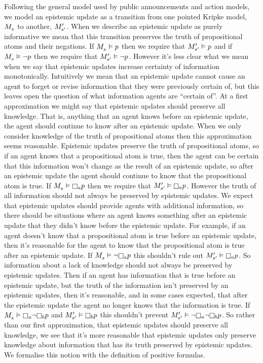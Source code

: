 Following the general model used by public announcements and action models, we model an epistemic update as a transition from one pointed Kripke model, $\kPModel{\kStateS}$ to another, ${M^{\prime}_{{s}^{\prime}}}$.
When we describe an epistemic update as purely informative we mean that this transition preserves the truth of propositional atoms and their negations.
If $\kPModel{\kStateS} \entails \atomP$ then we require that ${M^{\prime}_{{s}^{\prime}}} \vDash p$ and if $\kPModel{\kStateS} \entails \lnot \atomP$ then we require that ${M^{\prime}_{{s}^{\prime}}} \vDash \lnot p$.
However it's less clear what we mean when we say that epistemic updates increase certainty of information monotonically.
Intuitively we mean that an epistemic update cannot cause an agent to forget or revise information that they were previously certain of, but this leaves open the question of what information agents are ``certain of''.
At a first approximation we might say that epistemic updates should preserve all knowledge.
That is, anything that an agent knows before an epistemic update, the agent should continue to know after an epistemic update.
When we only consider knowledge of the truth of propositional atoms then this approximation seems reasonable.
Epistemic updates preserve the truth of propositional atoms, so if an agent knows that a propositional atom is true, then the agent can be certain that this information won't change as the result of an epistemic update, so after an epistemic update the agent should continue to know that the propositional atom is true.
If $\kPModel{\kStateS} \entails \knowsA \atomP$ then we require that $\kPModelP{\kStateSP} \entails \knowsA \atomP$.
However the truth of all information should not always be preserved by epistemic updates.
We expect that epistemic updates should provide agents with additional information, so there should be situations where an agent knows something after an epistemic update that they didn't know before the epistemic update.
For example, if an agent doesn't know that a propositional atom is true before an epistemic update, then it's reasonable for the agent to know that the propositional atom is true after an epistemic update.
If $\kPModel{\kStateS} \entails \lnot \knowsA \atomP$ this shouldn't rule out $\kPModelP{\kStateSP} \entails \knowsA \atomP$.
So information about a lack of knowledge should not always be preserved by epistemic updates.
Then if an agent has information that is true before an epistemic update, but the truth of the information isn't preserved by an epistemic updates, then it's reasonable, and in some cases expected, that after the epistemic update the agent no longer knows that the information is true.
If $\kPModel{\kStateS} \entails \knowsA \lnot \knowsB \atomP$ and $\kPModelP{\kStateSP} \entails \knowsB \atomP$ this shouldn't prevent $\kPModelP{\kStateSP} \entails \lnot \knowsA \lnot \knowsB \atomP$.
So rather than our first approximation, that epistemic updates should preserve all knowledge, we see that it's more reasonable that epistemic updates only preserve knowledge about information that has its truth preserved by epistemic updates.
We formalise this notion with the definition of positive formulas.


